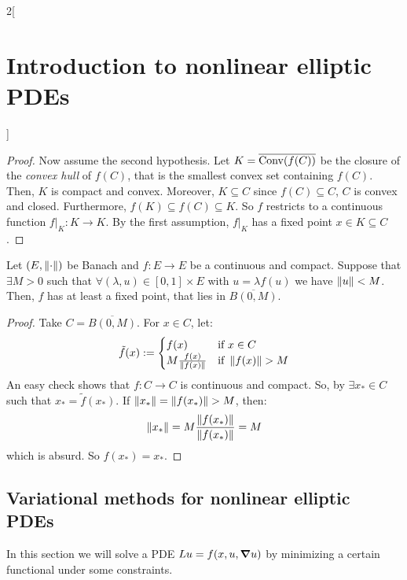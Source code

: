 \documentclass[../../../main_math.tex]{subfiles}
\begin{document}
\begin{multicols}{2}[\section{Introduction to nonlinear elliptic PDEs}]
\begin{proof}
    Now assume the second hypothesis. Let $K=\overline{\mathrm{Conv}(f(C))}$ be the closure of the \emph{convex hull} of $f(C)$, that is the smallest convex set containing $f(C)$. Then, $K$ is compact and convex. Moreover, $K\subseteq C$ since $f(C)\subseteq C$, $C$ is convex and closed. Furthermore, $f(K)\subseteq f(C)\subseteq K$. So $f$ restricts to a continuous function $f|_K:K\to K$. By the first assumption, $f|_K$ has a fixed point $x\in K\subseteq C$.
  \end{proof}
  \begin{theorem}\label{INEPDE:schaefer_fixed_point}
    Let $(E, \left\|\cdot\right\|)$ be Banach and $f:E\to E$ be a continuous and compact. Suppose that $\exists M>0$ such that $\forall (\lambda,u)\in [0,1]\times E$ with $u=\lambda f(u)$ we have $\left\|u\right\|<M$. Then, $f$ has at least a fixed point, that lies in $\overline{B(0,M)}$.
  \end{theorem}
  \begin{proof}
    Take $C=\overline{B(0,M)}$. For $x\in C$, let:
    $$
      \tilde{f}(x):=\begin{cases}
        f(x)                      & \text{if }x\in C        \\
        M\frac{f(x)}{\norm{f(x)}} & \text{if }\norm{f(x)}>M
      \end{cases}
    $$
    An easy check shows that $f:C\to C$ is continuous and compact. So, by  $\exists x_*\in C$ such that $x_*=\tilde{f}(x_*)$. If $\norm{x_*}=\norm{f(x_*)}> M$, then:
    $$
      \left\|x_*\right\|=M\frac{\left\|f(x_*)\right\|}{\left\|f(x_*)\right\|}=M
    $$
    which is absurd. So $f(x_*)=x_*$.
  \end{proof}
  \subsection{Variational methods for nonlinear elliptic PDEs}
  In this section we will solve a PDE $Lu=f(x,u,\grad u)$ by minimizing a certain functional under some constraints.

\end{multicols}
\end{document}
